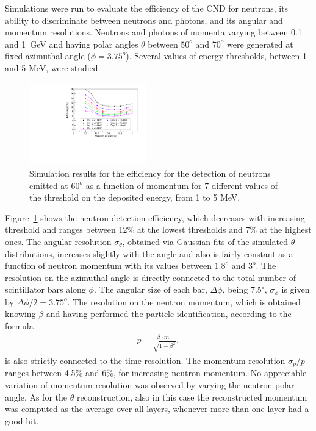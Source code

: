 Simulations were run to evaluate the efficiency of the CND for neutrons, its ability to discriminate between neutrons and photons, and its angular and momentum resolutions. Neutrons and photons of momenta varying between 0.1 and 1~GeV and having polar angles $\theta$ between $50^o$ and $70^o$ were generated at fixed azimuthal angle ($\phi = 3.75^o$). Several values of energy thresholds, between 1 and 5 MeV, were studied.
\begin{figure}[htb]  
\begin{center}
\includegraphics[width=0.45\textwidth]{Figure/Figure37.pdf}
\caption {Simulation results for the efficiency for the detection of neutrons emitted at $60^o$ as a function of momentum for 7 different values of the threshold on the deposited energy, from 1 to 5 MeV.}
\label{eff_vs_thr_mom}
\end{center}
\end{figure}
Figure~\ref{eff_vs_thr_mom} shows the neutron detection efficiency, which decreases with increasing threshold and ranges between 12\% at the lowest thresholds and 7\% at the highest ones. 
The angular resolution $\sigma_\theta$, obtained via Gaussian fits of the simulated $\theta$ distributions, increases slightly with the angle and also is fairly constant as a function of neutron momentum with its values between $1.8^o$ and $3^o$. 
The resolution on the azimuthal angle is directly connected to the total number of scintillator bars along $\phi$. The angular size of each bar, $\Delta\phi$, being 7.5$^{\circ}$, %
$\sigma_\phi$ is given by $\Delta\phi/2=3.75^o$.
The resolution on the neutron momentum, which is obtained knowing $\beta$ and having performed the particle identification, according to the formula
\begin{eqnarray}
p = \frac{\beta\cdot m_n}{\sqrt{1-\beta^2}},
\end{eqnarray}
is also strictly connected to the time resolution. The momentum resolution $\sigma_p/p$ ranges between 4.5\% and 6\%, for increasing neutron momentum. No appreciable variation of momentum resolution was observed by varying the neutron polar angle. As for the $\theta$ reconstruction, also in this case the reconstructed momentum was computed as the average over all layers, whenever more than one layer had a good hit.

